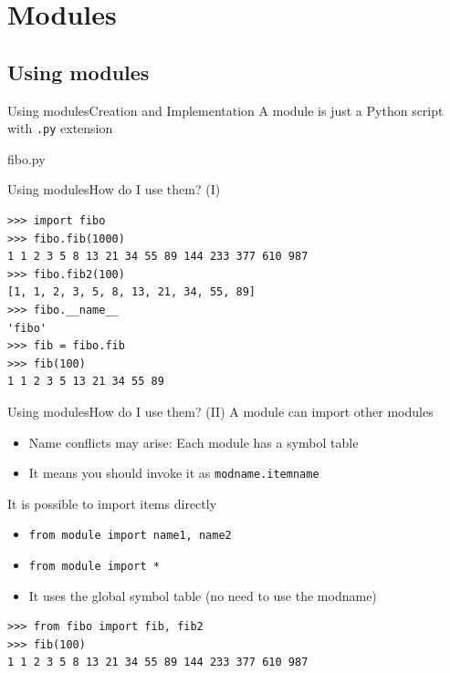 \documentclass[10pt,compress]{beamer} %
\begin{document}
\section{Modules}

\subsection{Using modules}
\begin{frame}[fragile]{Using modules}{Creation and Implementation}
	\vspace{-0.2cm}
	A module is just a Python script with \texttt{.py} extension
	\vspace{-0.2cm}
	\begin{exampleblock}{fibo.py}
	\vspace{-0.2cm}
	
	\vspace{-0.2cm}
	\end{exampleblock}
\end{frame}

\begin{frame}[fragile]{Using modules}{How do I use them? (I)}
	\begin{exampleblock}{}
	\begin{verbatim}
>>> import fibo
>>> fibo.fib(1000)
1 1 2 3 5 8 13 21 34 55 89 144 233 377 610 987
>>> fibo.fib2(100)
[1, 1, 2, 3, 5, 8, 13, 21, 34, 55, 89]
>>> fibo.__name__
'fibo'
>>> fib = fibo.fib
>>> fib(100)
1 1 2 3 5 13 21 34 55 89
\end{verbatim}
	\vspace{-0.2cm}
	\end{exampleblock}
\end{frame}

\begin{frame}[fragile]{Using modules}{How do I use them?  (II)}
	A module can import other modules
		\begin{itemize}
		\item Name conflicts may arise: Each module has a symbol table
		\item It means you should invoke it as \texttt{modname.itemname}
		\end{itemize}
 	It is possible to import items directly
		\begin{itemize}
		\item \texttt{from module import name1, name2}
		\item \texttt{from module import *}
		\item It uses the global symbol table (no need to use the modname)
			\end{itemize}
	
	\begin{exampleblock}{}
	\begin{verbatim}
>>> from fibo import fib, fib2
>>> fib(100)
1 1 2 3 5 8 13 21 34 55 89 144 233 377 610 987
\end{verbatim}
	\end{exampleblock}
\end{frame}
\end{document}
